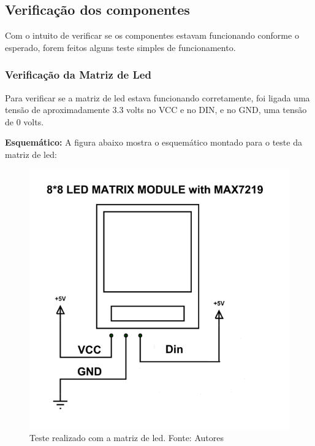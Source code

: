 \documentclass[conference]{IEEEtran}
\begin{document}
\begin{itemize}

\end{itemize}

\subsection{Verificação dos componentes}
Com o intuito de verificar se os componentes estavam funcionando conforme o esperado, forem feitos alguns teste simples de funcionamento.
\subsubsection{Verificação da Matriz de Led}
Para verificar se a matriz de led estava funcionando corretamente, foi ligada uma tensão de aproximadamente 3.3 volts no VCC e no DIN, e no GND, uma tensão de 0 volts.

\textbf{Esquemático:}
A figura abaixo mostra o esquemático montado para o teste da matriz de led:
\begin{figure}[H]
  \centering
  \includegraphics[width=0.5\linewidth]{dot}
  \caption{Teste realizado com a matriz de led. Fonte: Autores}
  \label{fig:dem_dot}
\end{figure}
\end{document}
